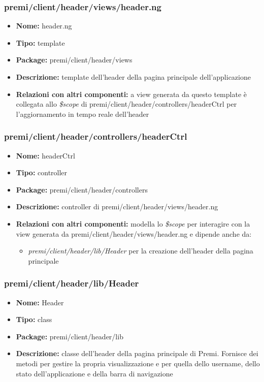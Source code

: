\subsubsection{premi/client/header/views/header.ng}
\begin{itemize}
  \item[] \textbf{Nome:} header.ng
  \item[] \textbf{Tipo:} template
  \item[] \textbf{Package:} premi/client/header/views
  \item[] \textbf{Descrizione:} template dell'header della pagina principale dell'applicazione
  \item[] \textbf{Relazioni con altri componenti:} a view generata da questo template è collegata allo \textit{\$scope} di premi/client/header/controllers/headerCtrl per l'aggiornamento in tempo reale dell'header
\end{itemize}


\subsubsection{premi/client/header/controllers/headerCtrl}
\begin{itemize}
  \item[] \textbf{Nome:} headerCtrl
  \item[] \textbf{Tipo:} controller
  \item[] \textbf{Package:} premi/client/header/controllers
  \item[] \textbf{Descrizione:} controller di premi/client/header/views/header.ng
  \item[] \textbf{Relazioni con altri componenti:} modella lo \textit{\$scope} per interagire con la view generata da premi/client/header/views/header.ng e dipende anche da:
 \begin{itemize}
 \item \textit{premi/client/header/lib/Header} per la creazione dell'header della pagina principale
 \end{itemize}
\end{itemize}


\subsubsection{premi/client/header/lib/Header}
\begin{itemize}
  \item[] \textbf{Nome:} Header
  \item[] \textbf{Tipo:} class
  \item[] \textbf{Package:} premi/client/header/lib
  \item[] \textbf{Descrizione:} classe dell'header della pagina principale di Premi. Fornisce dei metodi per gestire la propria visualizzazione e per quella dello username, dello stato dell'applicazione e della barra di navigazione
\end{itemize} 




